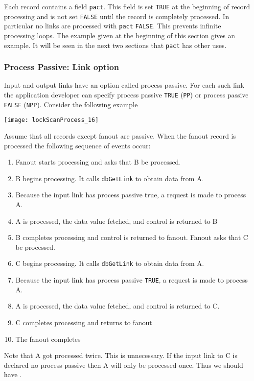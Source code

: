 Each record contains a field \verb|pact|. This field is set \verb|TRUE| at the beginning of record processing and is not set \verb|FALSE| until 
the record is completely processed. In particular no links are processed with \verb|pact| \verb|FALSE|. This prevents infinite 
processing loops. The example given at the beginning of this section gives an example. It will be seen in the next two 
sections that \verb|pact| has other uses.

\subsubsection{Process Passive: Link option}

Input and output links have an option called process passive. For each such link the application developer can specify 
process passive \verb|TRUE| (\verb|PP|) or process passive \verb|FALSE| (\verb|NPP|). Consider the following example 

\begin{center}
\texttt{[image: lockScanProcess\_16]}
\end{center}

Assume that all records except fanout are passive. When the fanout record is processed the following sequence of events 
occur:

\begin{enumerate}\item Fanout starts processing and asks that B be processed.

\item B begins processing. It calls \verb|dbGetLink| to obtain data from A.

\item Because the input link has process passive true, a request is made to process A.

\item A is processed, the data value fetched, and control is returned to B

\item B completes processing and control is returned to fanout. Fanout asks that C be processed.

\item C begins processing. It calls \verb|dbGetLink| to obtain data from A.

\item Because the input link has process passive \verb|TRUE|, a request is made to process A.

\item A is processed, the data value fetched, and control is returned to C.

\item C completes processing and returns to fanout

\item The fanout completes

\end{enumerate}Note that A got processed twice. This is unnecessary. If the input link to C is declared no process passive then A will only 
be processed once. Thus we should have .

